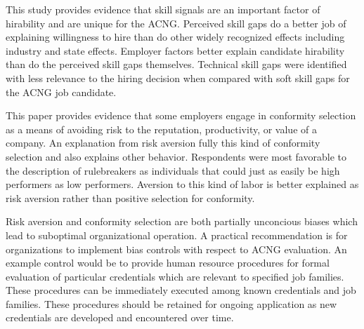 \documentclass[review]{elsarticle}
\begin{document}
This study provides evidence that skill signals are an important factor of hirability and are unique for the ACNG.
Perceived skill gaps do a better job of explaining willingness to hire than do other widely recognized effects including industry and state effects.
Employer factors better explain candidate hirability than do the perceived skill gaps themselves.
Technical skill gaps were identified with less relevance to the hiring decision when compared with soft skill gaps for the ACNG job candidate.

This paper provides evidence that some employers engage in conformity selection as a means of avoiding risk to the reputation, productivity, or value of a company.
An explanation from risk aversion fully this kind of conformity selection and also explains other behavior.
Respondents were most favorable to the description of rulebreakers as individuals that could just as easily be high performers as low performers.
Aversion to this kind of labor is better explained as risk aversion rather than positive selection for conformity.

Risk aversion and conformity selection are both partially unconcious biases which lead to suboptimal organizational operation.
A practical recommendation is for organizations to implement bias controls with respect to ACNG evaluation.
An example control would be to provide human resource procedures for formal evaluation of particular credentials which are relevant to specified job families.
These procedures can be immediately executed among known credentials and job families.
These procedures should be retained for ongoing application as new credentials are developed and encountered over time.
\end{document}
